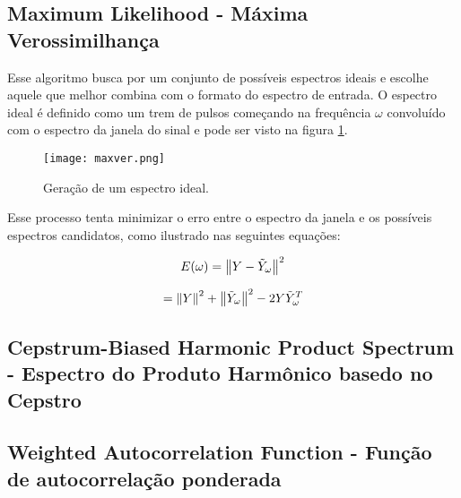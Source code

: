 \subsection{Maximum Likelihood - Máxima Verossimilhança}

Esse algoritmo busca por um conjunto de possíveis espectros ideais e escolhe aquele que melhor combina com o formato do espectro de entrada. O espectro ideal é definido como um trem de pulsos começando na frequência $\omega$ convoluído com o espectro da janela do sinal e pode ser visto na figura \ref{fig:maxver}.

     \begin{figure}%
\centering
\texttt{[image: maxver.png]}
\caption{Geração de um espectro ideal.}
\label{fig:maxver}
\end{figure}

Esse processo tenta minimizar o erro entre o espectro da janela e os possíveis espectros candidatos, como ilustrado nas seguintes equações:

$$E(\omega) = \left\lVert Y - \tilde{Y}_\omega\right\rVert^{2}$$

$$= \left\lVert Y\right\rVert^{2} + \left\lVert\tilde{Y}_\omega\right\rVert^{2} - 2Y\tilde{Y}_\omega^{T}$$


\subsection{Cepstrum-Biased Harmonic Product Spectrum - Espectro do Produto Harmônico basedo no Cepstro}
\subsection{Weighted Autocorrelation Function - Função de autocorrelação ponderada}


